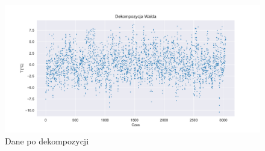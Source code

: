 \documentclass{article}
\theoremstyle{break}
\begin{document}
	\begin{figure}[H]
		\begin{center}
			\includegraphics[scale=0.5]{plot4.pdf}
			\caption{Dane po dekompozycji}
			\label{fig:p4}
		\end{center}
	\end{figure}
	
\end{document}
